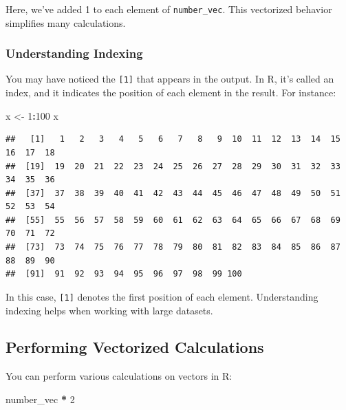 \documentclass[
]{book}
\newenvironment{Shaded}{\begin{snugshade}}{\end{snugshade}}
\newcommand{\DecValTok}[1]{\textcolor[rgb]{0.00,0.00,0.81}{#1}}
\newcommand{\NormalTok}[1]{#1}
\newcommand{\OtherTok}[1]{\textcolor[rgb]{0.56,0.35,0.01}{#1}}
\newcommand{\SpecialCharTok}[1]{\textcolor[rgb]{0.81,0.36,0.00}{\textbf{#1}}}
\begin{document}
Here, we've added 1 to each element of \texttt{number\_vec}. This vectorized behavior simplifies many calculations.

\hypertarget{understanding-indexing}{%
\subsubsection{Understanding Indexing}\label{understanding-indexing}}

You may have noticed the \texttt{{[}1{]}} that appears in the output. In R, it's called an index, and it indicates the position of each element in the result. For instance:

\begin{Shaded}
\begin{Highlighting}[]
\NormalTok{x }\OtherTok{\textless{}{-}} \DecValTok{1}\SpecialCharTok{:}\DecValTok{100}
\NormalTok{x}
\end{Highlighting}
\end{Shaded}

\begin{verbatim}
##   [1]   1   2   3   4   5   6   7   8   9  10  11  12  13  14  15  16  17  18
##  [19]  19  20  21  22  23  24  25  26  27  28  29  30  31  32  33  34  35  36
##  [37]  37  38  39  40  41  42  43  44  45  46  47  48  49  50  51  52  53  54
##  [55]  55  56  57  58  59  60  61  62  63  64  65  66  67  68  69  70  71  72
##  [73]  73  74  75  76  77  78  79  80  81  82  83  84  85  86  87  88  89  90
##  [91]  91  92  93  94  95  96  97  98  99 100
\end{verbatim}

In this case, \texttt{{[}1{]}} denotes the first position of each element. Understanding indexing helps when working with large datasets.

\hypertarget{performing-vectorized-calculations}{%
\subsection{Performing Vectorized Calculations}\label{performing-vectorized-calculations}}

You can perform various calculations on vectors in R:

\begin{Shaded}
\begin{Highlighting}[]
\NormalTok{number\_vec }\SpecialCharTok{*} \DecValTok{2}
\end{Highlighting}
\end{Shaded}
\end{document}
